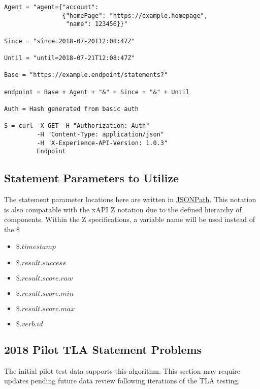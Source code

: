 \documentclass{article}
\begin{document}
\begin{lstlisting}[frame=single]
Agent = "agent={"account":
                {"homePage": "https://example.homepage",
                 "name": 123456}}"

Since = "since=2018-07-20T12:08:47Z"

Until = "until=2018-07-21T12:08:47Z"

Base = "https://example.endpoint/statements?"

endpoint = Base + Agent + "&" + Since + "&" + Until

Auth = Hash generated from basic auth

S = curl -X GET -H "Authorization: Auth"
         -H "Content-Type: application/json"
         -H "X-Experience-API-Version: 1.0.3"
         Endpoint
\end{lstlisting}

\subsection{Statement Parameters to Utilize}
The statement parameter locations here are written in
\href{http://goessner.net/articles/JsonPath/}{JSONPath}. This notation
is also compatable with the xAPI Z notation due to the defined
hierarchy of components. Within the Z specifications, a variable name
will be used instead of the $\$$
\begin{itemize}
\item $\$.timestamp$
\item $\$.result.success$
\item $\$.result.score.raw$
\item $\$.result.score.min$
\item $\$.result.score.max$
\item $\$.verb.id$
\end{itemize}

\subsection{2018 Pilot TLA Statement Problems}
The initial pilot test data supports this algorithm.
This section may require updates pending future data review following iterations of the TLA testing.
\end{document}
